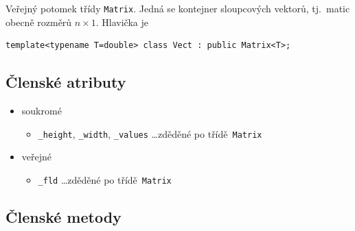 \documentclass[11pt,a4paper]{article}
\theoremstyle{remark}
\begin{document}
Veřejný potomek třídy \verb=Matrix=.
Jedná se kontejner sloupcových vektorů, tj.~matic obecně rozměrů $n\times 1$.
Hlavička je
\begin{verbatim}
template<typename T=double> class Vect : public Matrix<T>;
\end{verbatim}

\subsection{Členské atributy}

\begin{itemize}
  \item soukromé
  \begin{itemize}
    \item \verb=_height=, \verb=_width=, \verb=_values= \ldots zděděné po
      třídě~\verb=Matrix=
  \end{itemize}
  \item veřejné
  \begin{itemize}
    \item \verb=_fld= \ldots zděděné po třídě~\verb=Matrix=
  \end{itemize}
\end{itemize}

\subsection{Členské metody}
\end{document}
